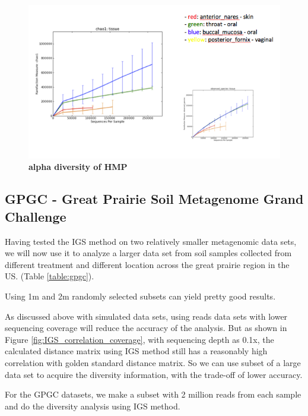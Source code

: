 \documentclass[12pt]{report}
\begin{document}
\begin{figure}[!ht]
 \centerline{\includegraphics[width=7in]{./figures/HMP_alpha.png}}
\caption{\bf alpha diversity of HMP}
\label{fig:HMP_alpha}
\end{figure}





\subsection{GPGC - Great Prairie Soil Metagenome Grand Challenge}

Having tested the IGS method on two relatively smaller metagenomic data sets, we will now use it to analyze 
a larger data set from soil samples collected from different treatment and different location across the great prairie region in the US. 
(Table \ref{table:gpgc}). 




Using 1m and 2m randomly selected subsets can yield pretty good results.

As discussed above with simulated data sets, using reads data sets with lower sequencing coverage will reduce
the accuracy of the analysis. But as shown in Figure \ref{fig:IGS_correlation_coverage}, with sequencing depth
as 0.1x, the calculated distance matrix using IGS method still has a reasonably high correlation with golden standard
distance matrix. So we can use subset of a large data set to acquire the diversity information, with the trade-off of
lower accuracy. 

For the GPGC datasets, we make a subset with 2 million reads from each sample and do the diversity analysis
using IGS method. 
\end{document}
